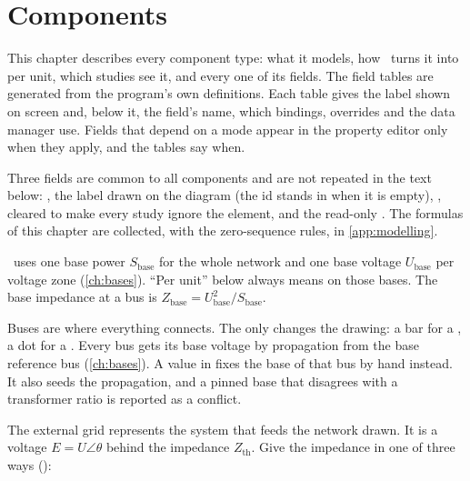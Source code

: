\chapter{Components}\label{ch:components}

This chapter describes every component type: what it models, how \app\ turns it into per
unit, which studies see it, and every one of its fields. The field tables are generated
from the program's own definitions. Each table gives the label shown on screen and,
below it, the field's name, which bindings, overrides and the data manager use. Fields
that depend on a mode appear in the property editor only when they apply, and the tables
say when.

Three fields are common to all components and are not repeated in the text below:
, the label drawn on the diagram (the id stands in when it is empty), , cleared to make every study ignore the element, and the read-only . The
formulas of this chapter are collected, with the zero-sequence rules, in
\cref{app:modelling}.

\begin{note}
\app\ uses one base power $S_\text{base}$ for the whole network and one base voltage
$U_\text{base}$ per voltage zone (\cref{ch:bases}). ``Per unit'' below always means on
those bases. The base impedance at a bus is $Z_\text{base} = U_\text{base}^2 /
S_\text{base}$.
\end{note}


Buses are where everything connects. The  only changes the drawing: a bar for a
, a dot for a . Every bus gets its base voltage by propagation
from the base reference bus (\cref{ch:bases}). A value in  fixes the
base of that bus by hand instead. It also seeds the propagation, and a pinned base that
disagrees with a transformer ratio is reported as a conflict.




The external grid represents the system that feeds the network drawn. It is a voltage
$E = U\angle\theta$ behind the impedance $Z_\text{th}$. Give the impedance in one of
three ways ():

